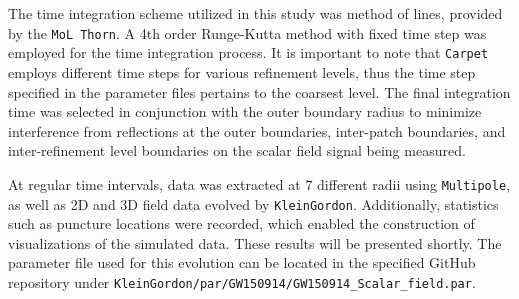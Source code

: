 The time integration scheme utilized in this study was method of lines, provided by the \texttt{MoL Thorn}. A 4th order Runge-Kutta method with fixed time step was employed for the time integration process. It is important to note that \texttt{Carpet} employs different time steps for various refinement levels, thus the time step specified in the parameter files pertains to the coarsest level. The final integration time was selected in conjunction with the outer boundary radius to minimize interference from reflections at the outer boundaries, inter-patch boundaries, and inter-refinement level boundaries on the scalar field signal being measured.

At regular time intervals, data was extracted at $7$ different radii using \texttt{Multipole}, as well as 2D and 3D field data evolved by \texttt{KleinGordon}. Additionally, statistics such as puncture locations were recorded, which enabled the construction of visualizations of the simulated data. These results will be presented shortly. The parameter file used for this evolution can be located in the specified GitHub repository under \texttt{KleinGordon/par/GW150914/GW150914\_Scalar\_field.par}.